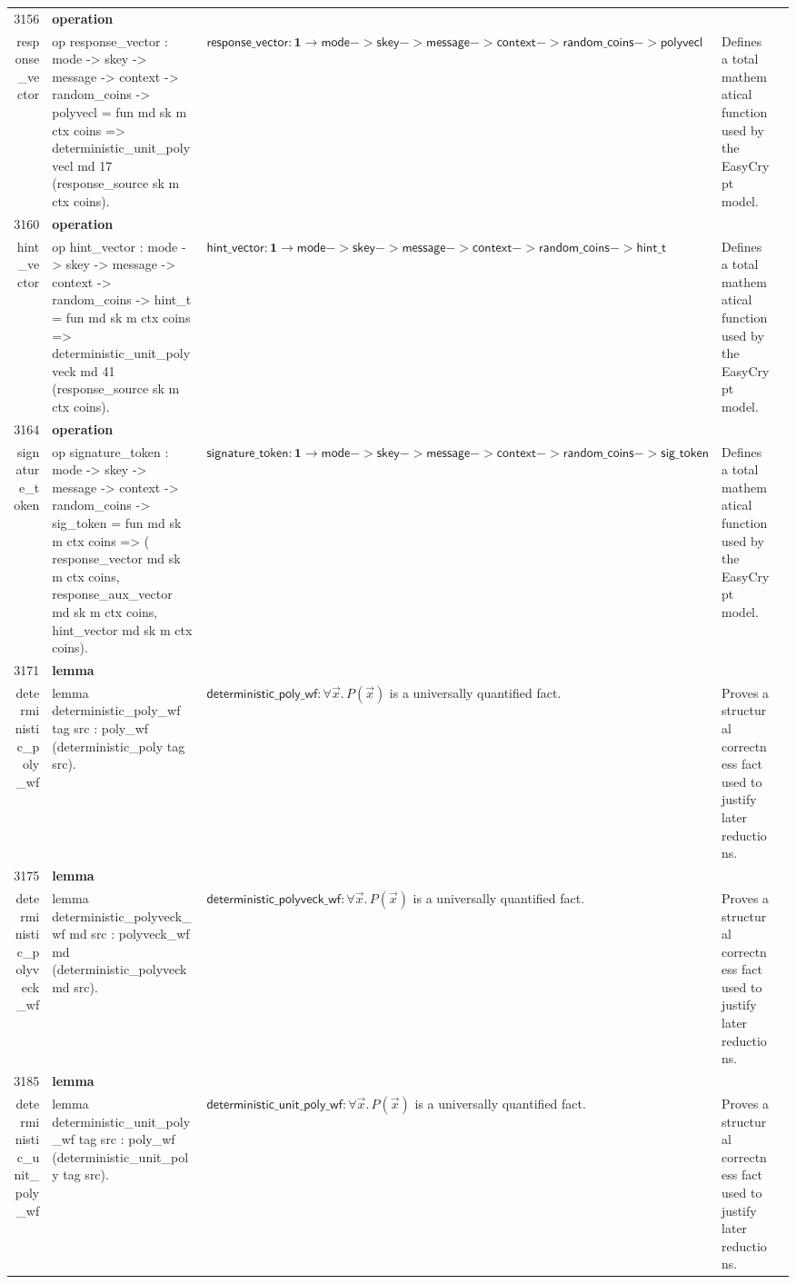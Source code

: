 \documentclass[10pt]{article}
\newcommand{\ec}[1]{\begingroup\ttfamily\scriptsize #1\endgroup}
\begin{document}
\begin{longtable}{r L{0.17\textwidth} L{0.26\textwidth} L{0.27\textwidth} L{0.20\textwidth}}
3156 & \textbf{operation}\\\ec{response\_vector} & \ec{op response\_vector : mode -> skey -> message -> context -> random\_coins -> polyvecl = fun md sk m ctx coins => deterministic\_unit\_polyvecl md 17 (response\_source sk m ctx coins).} & \(\mathsf{response\_vector} : \mathbf{1} \to \mathsf{mode -> skey -> message -> context -> random\_coins -> polyvecl}\) & Defines a total mathematical function used by the EasyCrypt model. \\
3160 & \textbf{operation}\\\ec{hint\_vector} & \ec{op hint\_vector : mode -> skey -> message -> context -> random\_coins -> hint\_t = fun md sk m ctx coins => deterministic\_unit\_polyveck md 41 (response\_source sk m ctx coins).} & \(\mathsf{hint\_vector} : \mathbf{1} \to \mathsf{mode -> skey -> message -> context -> random\_coins -> hint\_t}\) & Defines a total mathematical function used by the EasyCrypt model. \\
3164 & \textbf{operation}\\\ec{signature\_token} & \ec{op signature\_token : mode -> skey -> message -> context -> random\_coins -> sig\_token = fun md sk m ctx coins => ( response\_vector md sk m ctx coins, response\_aux\_vector md sk m ctx coins, hint\_vector md sk m ctx coins).} & \(\mathsf{signature\_token} : \mathbf{1} \to \mathsf{mode -> skey -> message -> context -> random\_coins -> sig\_token}\) & Defines a total mathematical function used by the EasyCrypt model. \\
3171 & \textbf{lemma}\\\ec{deterministic\_poly\_wf} & \ec{lemma deterministic\_poly\_wf tag src : poly\_wf (deterministic\_poly tag src).} & \(\mathsf{deterministic\_poly\_wf} : \forall \vec{x}.\, P(\vec{x})\) is a universally quantified fact. & Proves a structural correctness fact used to justify later reductions. \\
3175 & \textbf{lemma}\\\ec{deterministic\_polyveck\_wf} & \ec{lemma deterministic\_polyveck\_wf md src : polyveck\_wf md (deterministic\_polyveck md src).} & \(\mathsf{deterministic\_polyveck\_wf} : \forall \vec{x}.\, P(\vec{x})\) is a universally quantified fact. & Proves a structural correctness fact used to justify later reductions. \\
3185 & \textbf{lemma}\\\ec{deterministic\_unit\_poly\_wf} & \ec{lemma deterministic\_unit\_poly\_wf tag src : poly\_wf (deterministic\_unit\_poly tag src).} & \(\mathsf{deterministic\_unit\_poly\_wf} : \forall \vec{x}.\, P(\vec{x})\) is a universally quantified fact. & Proves a structural correctness fact used to justify later reductions. \\

\end{longtable}
\end{document}
